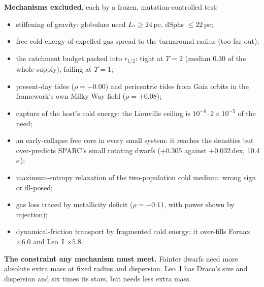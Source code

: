 \documentclass[10pt]{article}
\begin{document}
\textbf{Mechanisms excluded}, each by a frozen, mutation-controlled test:
\begin{itemize}
\item stiffening of gravity: globulars need $L_*\ge24$\,pc, dSphs $\le22$\,pc;
\item free cold energy of expelled gas spread to the turnaround radius (too far out);
\item the catchment budget packed into $r_{1/2}$: tight at $\Upsilon=2$ (median 0.30 of the whole supply), failing at $\Upsilon=1$;
\item present-day tides ($\rho=-0.00$) and pericentric tides from Gaia orbits in the framework's own Milky Way field ($\rho=+0.08$);
\item capture of the host's cold energy: the Liouville ceiling is $10^{-8}$--$2\times10^{-5}$ of the need;
\item an early-collapse free core in every small system: it reaches the densities but over-predicts SPARC's small rotating dwarfs ($+0.305$ against $+0.032$\,dex, 10.4$\sigma$);
\item maximum-entropy relaxation of the two-population cold medium: wrong sign or ill-posed;
\item gas loss traced by metallicity deficit ($\rho=-0.11$, with power shown by injection);
\item dynamical-friction transport by fragmented cold energy: it over-fills Fornax $\times6.0$ and Leo~I $\times5.8$.
\end{itemize}

\textbf{The constraint any mechanism must meet.} Fainter dwarfs need more absolute extra mass at fixed radius and dispersion. Leo~I has Draco's size and dispersion and six times its stars, but needs less extra mass.
\end{document}

